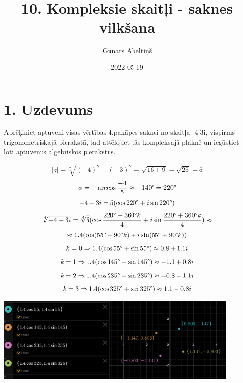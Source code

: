 \documentclass{article}
\title{10. Kompleksie skaitļi - saknes vilkšana}
\author{Gunārs Ābeltiņš}
\date{2022-05-19}
\begin{document}
\maketitle

\section*{1. Uzdevums}
Aprēķiniet aptuveni visas vērtības 4.pakāpes saknei no skaitļa -4-3i, vispirms -  trigonometriskajā pierakstā, tad attēlojiet tās kompleksajā plaknē un iegūstiet ļoti aptuvenus algebriskos pierakstus.

\begin{equation*}
    |z| = \sqrt[2]{(-4)^2 + (-3)^2} = \sqrt{16 + 9} = \sqrt{25} = 5
\end{equation*}
\begin{equation*}
    \phi = - \arccos \frac{-4}{5} \approx - 140 \degree = 220 \degree
\end{equation*}
\begin{equation*}
    -4 - 3i = 5(\cos 220 \degree + i \sin 220 \degree)
\end{equation*}
\begin{equation*}
    \sqrt[4]{-4 - 3i} = \sqrt[4]{5}(\cos \frac{220 \degree + 360 \degree k}{4} + i \sin \frac{220 \degree + 360 \degree k}{4}) \approx
\end{equation*}
\begin{equation*}
    \approx 1.4(\cos (55 \degree + 90 \degree k) + i \sin (55 \degree + 90 \degree k))
\end{equation*}
\begin{equation*}
    k = 0 \Rightarrow 1.4 (\cos 55 \degree + \sin 55 \degree) \approx 0.8 + 1.1i
\end{equation*}
\begin{equation*}
    k = 1 \Rightarrow 1.4 (\cos 145 \degree + \sin 145 \degree) \approx -1.1 + 0.8i
\end{equation*}
\begin{equation*}
    k = 2 \Rightarrow 1.4 (\cos 235 \degree + \sin 235 \degree) \approx -0.8 - 1.1i
\end{equation*}
\begin{equation*}
    k = 3 \Rightarrow 1.4 (\cos 325 \degree + \sin 325 \degree) \approx 1.1 - 0.8i
\end{equation*}

\includegraphics[width=0.9\textwidth, center]{1}
\end{document}
